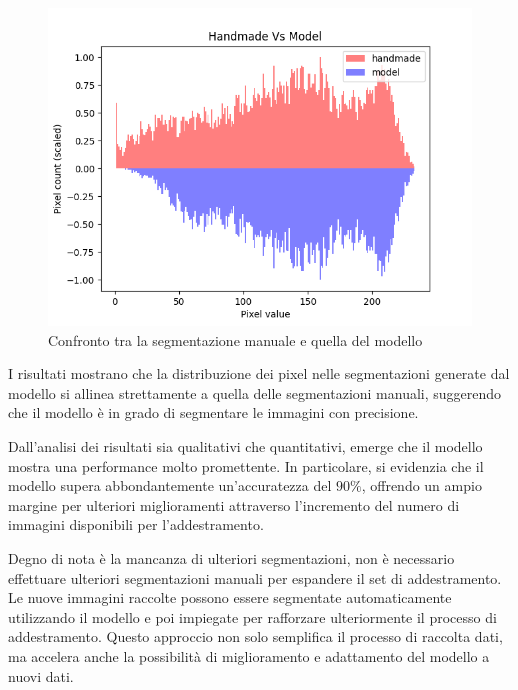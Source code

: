\begin{figure}[!ht]
    \centering
    \includegraphics[width=0.7\columnwidth]{Immagini/handmade_vs_model_scaled.png}
    \caption{Confronto tra la segmentazione manuale e quella del modello}
    \label{fig:confronto tra la segmentazione manuale e quella del modello}
\end{figure}

I risultati mostrano che la distribuzione dei pixel nelle segmentazioni generate dal modello si
allinea strettamente a quella delle segmentazioni manuali, suggerendo che il modello è in grado di
segmentare le immagini con precisione.


Dall'analisi dei risultati sia qualitativi che quantitativi, emerge che il modello mostra una
performance molto promettente. In particolare, si evidenzia che il modello supera abbondantemente
un'accuratezza del $90\%$, offrendo un ampio margine per ulteriori miglioramenti attraverso
l'incremento del numero di immagini disponibili per l'addestramento.

Degno di nota è la mancanza di ulteriori segmentazioni, non è necessario effettuare ulteriori
segmentazioni manuali per espandere il set di addestramento. Le nuove immagini raccolte possono
essere segmentate automaticamente utilizzando il modello e poi impiegate per rafforzare
ulteriormente il processo di addestramento. Questo approccio non solo semplifica il processo di
raccolta dati, ma accelera anche la possibilità di miglioramento e adattamento del modello a nuovi
dati.

